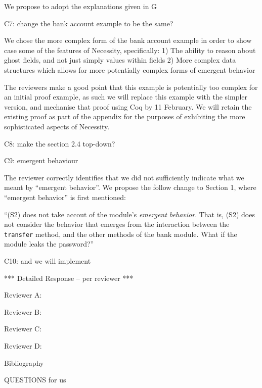 We propose to adopt the explanations given in G

C7: change the bank account example to be the same?
 
 We chose the more complex form of the bank account example in order to show case some of the features of Necessity, specifically:
1) The ability to reason about ghost fields, and not just simply values within fields
2) More complex data structures which allows for more potentially complex forms of emergent behavior

The reviewers make a good point that this example is potentially too complex for an initial proof example, as such we will 
replace this example with the simpler version, and mechanise that proof using Coq by 11 February. We will retain the existing proof as part 
of the appendix for the purposes of exhibiting the more sophisticated aspects of Necessity.
 
C8: make the section 2.4 top-down?

C9: emergent behaviour 

 The reviewer correctly identifies that we did not sufficiently indicate what we meant by ``emergent behavior''. We propose the follow change 
to Section 1, where ``emergent behavior'' is first mentioned:

``(S2) does not take accout of the module's \emph{emergent behavior}. That is, (S2) does not consider the behavior that emerges from the interaction between the 
\texttt{transfer} method, and the other methods of the bank module. What if the module leaks the password?''

 
C10: and we will implement
 


*** Detailed Response -- per reviewer ***

Reviewer A:

Reviewer B:

Reviewer C:

Reviewer D:

Bibliography



QUESTIONS for us